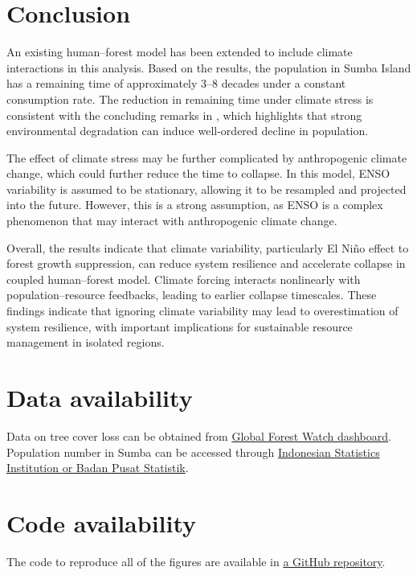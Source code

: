 \documentclass{style}
\begin{document}
\section{Conclusion}

An existing human–forest model has been extended to include climate interactions in this analysis. Based on the results, the population in Sumba Island has a remaining time of approximately 3–8 decades under a constant consumption rate. The reduction in remaining time under climate stress is consistent with the concluding remarks in \cite{bologna2020deforestation}, which highlights that strong environmental degradation can induce well-ordered decline in population.

The effect of climate stress may be further complicated by anthropogenic climate change, which could further reduce the time to collapse. In this model, ENSO variability is assumed to be stationary, allowing it to be resampled and projected into the future. However, this is a strong assumption, as ENSO is a complex phenomenon that may interact with anthropogenic climate change.

Overall, the results indicate that climate variability, particularly El Niño effect to forest growth suppression, can reduce system resilience and accelerate collapse in coupled human–forest model. Climate forcing interacts nonlinearly with population–resource feedbacks, leading to earlier collapse timescales. These findings indicate that ignoring climate variability may lead to overestimation of system resilience, with important implications for sustainable resource management in isolated regions.


\section*{Data availability}
Data on tree cover loss can be obtained from \href{www.globalforestwatch.org}{Global Forest Watch dashboard}. Population number in Sumba can be accessed through  \href{https://ntt.bps.go.id}{Indonesian Statistics Institution or Badan Pusat Statistik}.

\section*{Code availability}
The code to reproduce all of the figures are available in \href{https://github.com/nathasya-abenita/diploma_bgc}{a GitHub repository}.



\end{document}

